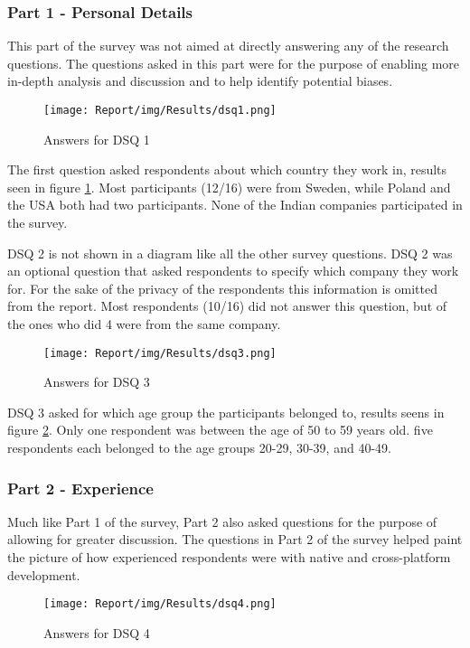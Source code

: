 \documentclass[a4paper,12pt]{article}
\begin{document}
\subsubsection{Part 1 - Personal Details}
This part of the survey was not aimed at directly answering any of the research questions. The questions asked in this part were for the purpose of enabling more in-depth analysis and discussion and to help identify potential biases.

\begin{figure}[ht!]
    \centering
    \texttt{[image: Report/img/Results/dsq1.png]}
    \caption{Answers for DSQ 1}
    \label{fig:res_devq1}
\end{figure}

The first question asked respondents about which country they work in, results seen in figure \ref{fig:res_devq1}. Most participants (12/16) were from Sweden, while Poland and the USA both had two participants. None of the Indian companies participated in the survey.

DSQ 2 is not shown in a diagram like all the other survey questions. DSQ 2 was an optional question that asked respondents to specify which company they work for. For the sake of the privacy of the respondents this information is omitted from the report. Most respondents (10/16) did not answer this question, but of the ones who did 4 were from the same company. 

\begin{figure}[ht!]
    \centering
    \texttt{[image: Report/img/Results/dsq3.png]}
    \caption{Answers for DSQ 3}
    \label{fig:res_devq3}
\end{figure}

DSQ 3 asked for which age group the participants belonged to, results seens in figure \ref{fig:res_devq3}. Only one respondent was between the age of 50 to 59 years old. five respondents each belonged to the age groups 20-29, 30-39, and 40-49.

\subsubsection{Part 2 - Experience}
Much like Part 1 of the survey, Part 2 also asked questions for the purpose of allowing for greater discussion. The questions in Part 2 of the survey helped paint the picture of how experienced respondents were with native and cross-platform development.

\begin{figure}[ht!]
    \centering
    \texttt{[image: Report/img/Results/dsq4.png]}
    \caption{Answers for DSQ 4}
    \label{fig:res_devq4}
\end{figure}
\end{document}
